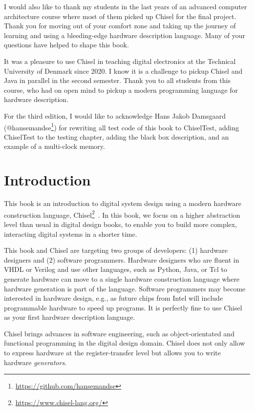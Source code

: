 \documentclass[%
    10pt,
    headinclude, footexclude,
    openright, %
    notitlepage,
    cleardoubleempty,
    headsepline,
    pointlessnumbers,
    bibtotoc, idxtotoc,
    ]{scrbook}
\newcommand{\myref}[2]{\href{#1}{#2}}
\renewcommand{\myref}[2]{{#2}{\footnote{\url{#1}}}}
\begin{document}
I would also like to thank my students in the last years of an advanced computer
architecture course where most of them picked up Chisel for the final project.
Thank you for moving out of your comfort zone and taking up the journey of
learning and using a bleeding-edge hardware description language.
Many of your questions have helped to shape this book.

It was a pleasure to use Chisel in teaching digital electronics
at the Technical University of Denmark since 2020.
I know it is a challenge to pickup Chisel and Java in parallel in the second
semester. Thank you to all students from this course, who had on open mind to
pickup a modern programming language for hardware description.

For the third edition, I would like to acknowledge Hans Jakob Damsgaard
(\myref{https://github.com/hansemandse}{@hansemandse}) for rewriting
all test code of this book to ChiselTest, adding ChiselTest to the testing chapter, adding the black
box description, and an example of a multi-clock memory.


\mainmatter

\chapter{Introduction}
\label{sec:intro}

This book is an introduction to digital system design using a modern hardware
construction language, \myref{https://www.chisel-lang.org/}{Chisel}~\cite{chisel:dac2012}.
In this book, we focus on a higher abstraction level than usual in digital design books,
to enable you to build more complex, interacting digital systems in a shorter time.

This book and Chisel are targeting two groups of developers:
(1) hardware designers and (2) software programmers.
Hardware designers who are fluent in VHDL or Verilog and use other languages, such as Python,
Java, or Tcl to generate hardware can move to a single hardware construction language
where hardware generation is part of the language.
Software programmers may become interested in hardware design,
e.g., as future chips from Intel will include programmable hardware to speed up programs.
It is perfectly fine to use Chisel as your first hardware description language.

Chisel brings advances in software engineering, such as object-orientated
and functional programming in the digital design domain.
Chisel does not only allow to express hardware at the register-transfer level
but allows you to write hardware \emph{generators}.
\end{document}
